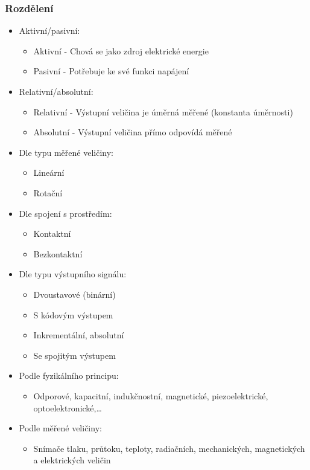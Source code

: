 \subsubsection*{Rozdělení}
\begin{itemize}
  \item Aktivní/pasivní:\begin{itemize}
    \item Aktivní - Chová se jako zdroj elektrické energie
    \item Pasivní - Potřebuje ke své funkci napájení
  \end{itemize}
  \item Relativní/absolutní: \begin{itemize}
    \item Relativní - Výstupní veličina je úměrná měřené (konstanta úměrnosti)
    \item Absolutní - Výstupní veličina přímo odpovídá měřené
  \end{itemize}
  \item Dle typu měřené veličiny: \begin{itemize}
    \item Lineární
    \item Rotační
  \end{itemize}
  \item Dle spojení s prostředím: \begin{itemize}
    \item Kontaktní
    \item Bezkontaktní
  \end{itemize}
  \item Dle typu výstupního signálu: \begin{itemize}
    \item Dvoustavové (binární)
    \item S kódovým výstupem
    \item Inkrementální, absolutní
    \item Se spojitým výstupem
  \end{itemize}
  \item Podle fyzikálního principu: \begin{itemize}
    \item Odporové, kapacitní, indukčnostní, magnetické, piezoelektrické, optoelektronické,\dots
  \end{itemize}
  \item Podle měřené veličiny: \begin{itemize}
    \item Snímače tlaku, průtoku, teploty, radiačních, mechanických, magnetických a elektrických veličin

\end{itemize}
\end{itemize}

